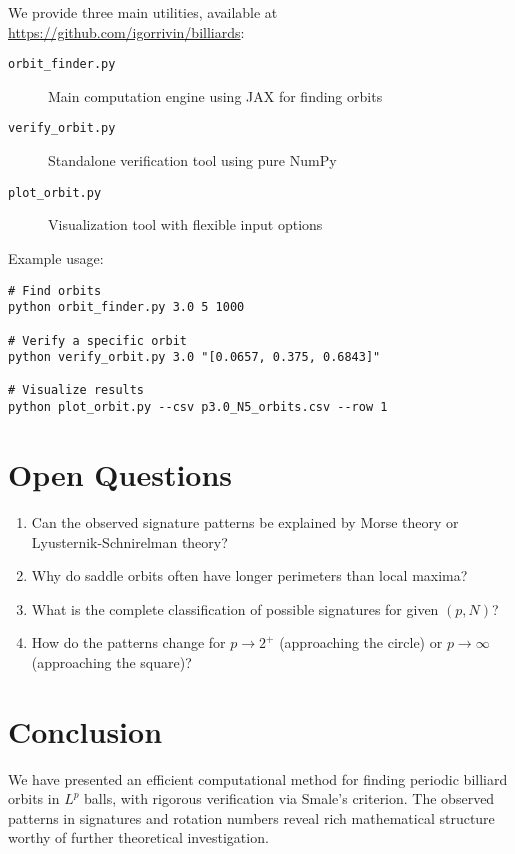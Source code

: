 \documentclass[11pt]{amsart}
\theoremstyle{plain}
\theoremstyle{definition}
\theoremstyle{remark}
\begin{document}
We provide three main utilities, available at \url{https://github.com/igorrivin/billiards}:

\begin{description}
\item[\texttt{orbit\_finder.py}] Main computation engine using JAX\cite{jax2018github} for finding orbits
\item[\texttt{verify\_orbit.py}] Standalone verification tool using pure NumPy
\item[\texttt{plot\_orbit.py}] Visualization tool with flexible input options
\end{description}

Example usage:
\begin{verbatim}
# Find orbits
python orbit_finder.py 3.0 5 1000

# Verify a specific orbit
python verify_orbit.py 3.0 "[0.0657, 0.375, 0.6843]"

# Visualize results
python plot_orbit.py --csv p3.0_N5_orbits.csv --row 1
\end{verbatim}

\section{Open Questions}

\begin{enumerate}
\item Can the observed signature patterns be explained by Morse theory or Lyusternik-Schnirelman theory?
\item Why do saddle orbits often have longer perimeters than local maxima?
\item What is the complete classification of possible signatures for given $(p, N)$?
\item How do the patterns change for $p \to 2^+$ (approaching the circle) or $p \to \infty$ (approaching the square)?
\end{enumerate}

\section{Conclusion}

We have presented an efficient computational method for finding periodic billiard orbits in $L^p$ balls, with rigorous verification via Smale's criterion. The observed patterns in signatures and rotation numbers reveal rich mathematical structure worthy of further theoretical investigation.
\end{document}
